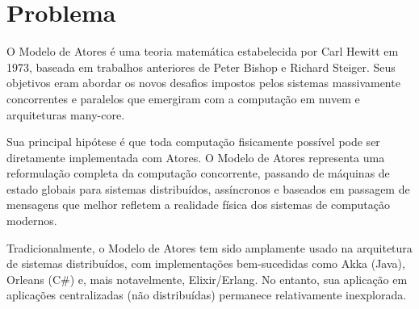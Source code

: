 \section{Problema}

O Modelo de Atores é uma teoria matemática estabelecida por Carl Hewitt em 1973, baseada em trabalhos anteriores de Peter Bishop e Richard Steiger. Seus objetivos eram abordar os novos desafios impostos pelos sistemas massivamente concorrentes e paralelos que emergiram com a computação em nuvem e arquiteturas many-core.

Sua principal hipótese é que toda computação fisicamente possível pode ser diretamente implementada com Atores. O Modelo de Atores representa uma reformulação completa da computação concorrente, passando de máquinas de estado globais para sistemas distribuídos, assíncronos e baseados em passagem de mensagens que melhor refletem a realidade física dos sistemas de computação modernos.

Tradicionalmente, o Modelo de Atores tem sido amplamente usado na arquitetura de sistemas distribuídos, com implementações bem-sucedidas como Akka (Java), Orleans (C\#) e, mais notavelmente, Elixir/Erlang. No entanto, sua aplicação em aplicações centralizadas (não distribuídas) permanece relativamente inexplorada.
